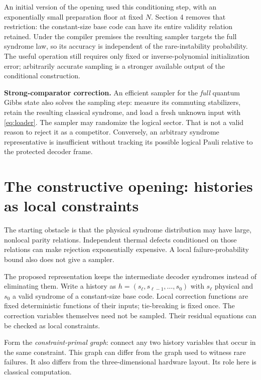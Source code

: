\documentclass[11pt,a4paper]{article}
\begin{document}
An initial version of the opening used this conditioning step, with an exponentially small preparation floor at fixed $N$. Section 4 removes that restriction: the constant-size base code can have its entire validity relation retained. Under the compiler premises the resulting sampler targets the full syndrome law, so its accuracy is independent of the rare-instability probability. The useful operation still requires only fixed or inverse-polynomial initialization error; arbitrarily accurate sampling is a stronger available output of the conditional construction.

\textbf{Strong-comparator correction.} An efficient sampler for the \emph{full} quantum Gibbs state also solves the sampling step: measure its commuting stabilizers, retain the resulting classical syndrome, and load a fresh unknown input with \eqref{eq:loader}. The sampler may randomize the logical sector. That is not a valid reason to reject it as a competitor. Conversely, an arbitrary syndrome representative is insufficient without tracking its possible logical Pauli relative to the protected decoder frame.

\section{The constructive opening: histories as local constraints}

The starting obstacle is that the physical syndrome distribution may have large, nonlocal parity relations. Independent thermal defects conditioned on those relations can make rejection exponentially expensive. A local failure-probability bound also does not give a sampler.

The proposed representation keeps the intermediate decoder syndromes instead of eliminating them. Write a history as $h=(s_\ell,s_{\ell-1},\ldots,s_0)$ with $s_\ell$ physical and $s_0$ a valid syndrome of a constant-size base code. Local correction functions are fixed deterministic functions of their inputs; tie-breaking is fixed once. The correction variables themselves need not be sampled. Their residual equations can be checked as local constraints.

Form the \emph{constraint-primal graph}: connect any two history variables that occur in the same constraint. This graph can differ from the graph used to witness rare failures. It also differs from the three-dimensional hardware layout. Its role here is classical computation.
\end{document}
